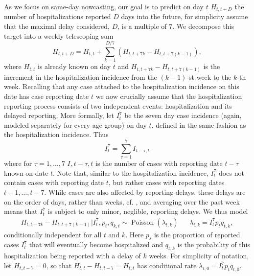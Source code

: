 As we focus on same-day nowcasting, our goal is to predict on day $t$ $H^{}_{t, t + D}$ the number of hospitalizations reported $D$ days into the future, for simplicity assume that the maximal delay considered, $D$, is a multiple of $7$. We decompose this target into a weekly telescoping sum 
$$
    H^{}_{t, t + D} = H^{}_{t, t} + \sum_{k = 1} ^{D / 7} (H^{}_{t, t + 7k} - H_{t, t + 7 ( k - 1)}),
$$
where $H_{t,t}$ is already known on day $t$ and $H_{t, t + 7k} - H_{t, t + 7 ( k - 1)}$ is the increment in the hospitalization incidence from the $(k-1)$-st week to the $k$-th week. Recalling that any case attached to the hospitalization incidence on this date has case reporting date $t$ we now crucially assume that the hospitalization reporting process consists of two independent events: hospitalization and its delayed reporting.
More formally, let $I^{7}_{t}$ be the seven day case incidence (again, modeled separately for every age group) on day $t$, defined in the same fashion as the hospitalization incidence. Thus 
$$
    I^{7}_t = \sum_{\tau = 1}^{7} I^{}_{t - \tau, t}
$$
where for $\tau = 1, \dots, 7$ $I^{},{t - \tau, t}$ is the number of cases with reporting date $t - \tau$ known on date $t$. Note that, similar to the hospitalization incidence, $I^{7}_t$ does not contain cases with reporting date $t$, but rather cases with reporting dates $t - 1, \dots, t - 7$. While cases are also affected by reporting delays, these delays are on the order of days, rather than weeks, cf. , and averaging over the past week means that $I^{7}_t$ is subject to only minor, neglible, reporting delays. We thus model 
\begin{align}
    \label{eq:hosp_increment_distribution}
    H_{t, t + 7k} - H^{}_{t, t + 7 ( k - 1)} | I^{7}_t, p^{}_{t}, q^{}_{k,t} \sim \operatorname{Poisson} \left( \lambda^{}_{t,k} \right) && \lambda^{}_{t,k} = I^{7}_{t} p^{}_{t} q^{}_{t, k},
\end{align}
conditionally independent for all $t$ and $k$.
Here $p^{}_s$ is the proportion of reported cases $I^{7}_{t}$ that will eventually become hospitalized and $q^{}_{t,k}$ is the probability of this hospitalization being reported with a delay of $k$ weeks.
For simplicity of notation, let $H_{t, t - 7} = 0$, so that $H_{t,t} - H_{t, t- 7} = H_{t,t}$ has conditional rate $\lambda_{t,0} = I^{7}_t p_{t}q_{t,0}$.


